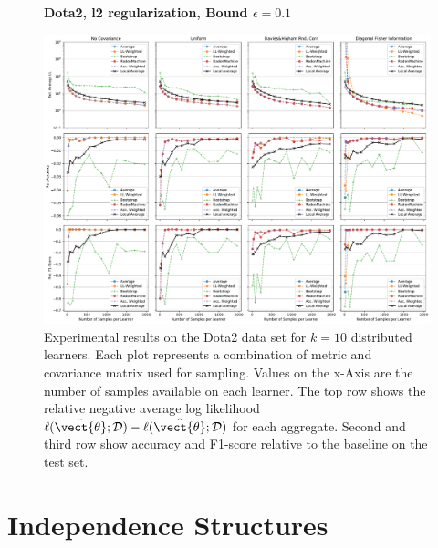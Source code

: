    \begin{landscape}
        \begin{figure}
            \centering
            \textbf{Dota2, l2 regularization, Bound $\epsilon=0.1$}\par\medskip
            \includegraphics[height=\dimexpr \textheight - 4\baselineskip\relax]{kapitel/figures/dota2_l2_0.1_neg_relative.pdf}
            \caption[Dota2 plots with l2 regularization and $\epsilon=0.1$]{Experimental results on the Dota2 data set for $k=10$ distributed learners. Each plot represents a combination of metric and covariance matrix used for sampling. Values on the x-Axis are the number of samples available on each learner. The top row shows the relative negative average log likelihood $\ell(\tilde{\vect{\theta}}; \mathcal{D}) - \ell(\hat{\vect{\theta}}; \mathcal{D})$ for each aggregate. Second and third row show accuracy and F1-score relative to the baseline on the test set.}
            \label{fig:analysis12}
        \end{figure}
    \end{landscape}

\section{Independence Structures}
\label{sec:apdx:struc}





\clearpage
